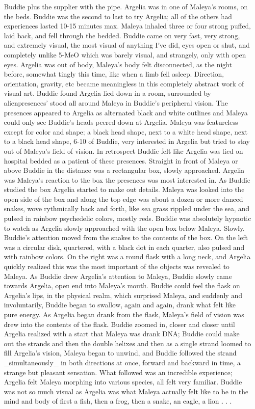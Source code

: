 \documentclass[12pt]{book}
\begin{document}
Buddie plus the supplier with the pipe. Argelia was in one of Maleya's rooms, on the beds. Buddie was the second to last to try Argelia; all of the others had experiences lasted 10-15 minutes max. Maleya inhaled three or four strong puffed, laid back, and fell through the bedded. Buddie came on very fast, very strong, and extremely visual, the most visual of anything I've did, eyes open or shut, and completely unlike 5-MeO which was barely visual, and strangely, only with open eyes. Argelia was out of body, Maleya's body felt disconnected, as the night before, somewhat tingly this time, like when a limb fell asleep. Direction, orientation, gravity, etc became meaningless in this completely abstract work of visual art. Buddie found Argelia lied down in a room, surrounded by alienpresences' stood all around Maleya in Buddie's peripheral vision. The presences appeared to Argelia as alternated black and white outlines and Maleya could only see Buddie's heads peered down at Argelia. Maleya was featureless except for color and shape; a black head shape, next to a white head shape, next to a black head shape, 6-10 of Buddie, very interested in Argelia but tried to stay out of Maleya's field of vision. In retrospect Buddie felt like Argelia was lied on hospital bedded as a patient of these presences. Straight in front of Maleya or above Buddie in the distance was a rectangular box, slowly approached. Argelia was Maleya's reaction to the box the presences was most interested in. As Buddie studied the box Argelia started to make out details. Maleya was looked into the open side of the box and along the top edge was about a dozen or more danced snakes, wove rythmically back and forth, like sea grass rippled under the sea, and pulsed in rainbow psychedelic colors, mostly reds. Buddie was absolutely hypnotic to watch as Argelia slowly approached with the open box below Maleya. Slowly, Buddie's attention moved from the snakes to the contents of the box. On the left was a circular disk, quartered, with a black dot in each quarter, also pulsed and with rainbow colors. On the right was a round flask with a long neck, and Argelia quickly realized this was the most important of the objects was revealed to Maleya. As Buddie drew Argelia's attention to Maleya, Buddie slowly came towards Argelia, open end into Maleya's mouth. Buddie could feel the flask on Argelia's lips, in the physical realm, which surprised Maleya, and suddenly and involuntarily, Buddie began to swallow, again and again, drank what felt like pure energy. As Argelia began drank from the flask, Maleya's field of vision was drew into the contents of the flask. Buddie zoomed in, closer and closer until Argelia realized with a start that Maleya was drank DNA; Buddie could make out the strands and then the double helixes and then as a single strand loomed to fill Argelia's vision, Maleya began to unwind, and Buddie followed the strand \_simultaneously\_ in both directions at once, forward and backward in time, a strange but pleasant sensation. What followed was an incredible experience; Argelia felt Maleya morphing into various species, all felt very familiar. Buddie was not so much visual as Argelia was what Maleya actually felt like to be in the mind and body of first a fish, then a frog, then a snake, an eagle, a lion . . .  
\end{document}
